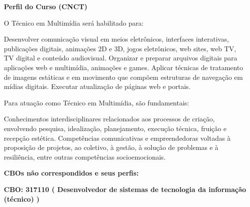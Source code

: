 \documentclass[
]{article}
\begin{document}
\textbf{Perfil do Curso (CNCT)}

O Técnico em Multimídia será habilitado para:

Desenvolver comunicação visual em meios eletrônicos, interfaces
interativas, publicações digitais, animações 2D e 3D, jogos eletrônicos,
web sites, web TV, TV digital e conteúdo audiovisual. Organizar e
preparar arquivos digitais para aplicações web e multimídia, animações e
games. Aplicar técnicas de tratamento de imagens estáticas e em
movimento que compõem estruturas de navegação em mídias digitais.
Executar atualização de páginas web e portais.

Para atuação como Técnico em Multimídia, são fundamentais:

Conhecimentos interdisciplinares relacionados aos processos de criação,
envolvendo pesquisa, idealização, planejamento, execução técnica,
fruição e recepção estética. Competências comunicativas e empreendedoras
voltadas à proposição de projetos, ao coletivo, à gestão, à solução de
problemas e à resiliência, entre outras competências socioemocionais.

\textbf{CBOs não correspondidos e seus perfis:}

\textbf{CBO: 317110  ( Desenvolvedor de sistemas de tecnologia da informação (técnico) )}
\end{document}
